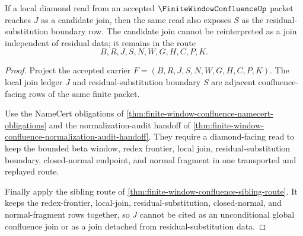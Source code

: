 \begin{theorem}
\label{thm:finite-window-confluence-residual-boundary-inversion}
If a local diamond read from an accepted $\FiniteWindowConfluenceUp$ packet reaches $J$ as a candidate join, then the same read also exposes $S$ as the residual-substitution boundary row. The candidate join cannot be reinterpreted as a join independent of residual data; it remains in the route
$$
B,R,J,S,N,W,G,H,C,P,K .
$$
\end{theorem}
\begin{proof}
Project the accepted carrier $F=(B,R,J,S,N,W,G,H,C,P,K)$. The local join ledger $J$ and residual-substitution boundary $S$ are adjacent confluence-facing rows of the same finite packet.

Use the NameCert obligations of \autoref{thm:finite-window-confluence-namecert-obligations} and the normalization-audit handoff of \autoref{thm:finite-window-confluence-normalization-audit-handoff}. They require a diamond-facing read to keep the bounded beta window, redex frontier, local join, residual-substitution boundary, closed-normal endpoint, and normal fragment in one transported and replayed route.

Finally apply the sibling route of \autoref{thm:finite-window-confluence-sibling-route}. It keeps the redex-frontier, local-join, residual-substitution, closed-normal, and normal-fragment rows together, so $J$ cannot be cited as an unconditional global confluence join or as a join detached from residual-substitution data.
\end{proof}

